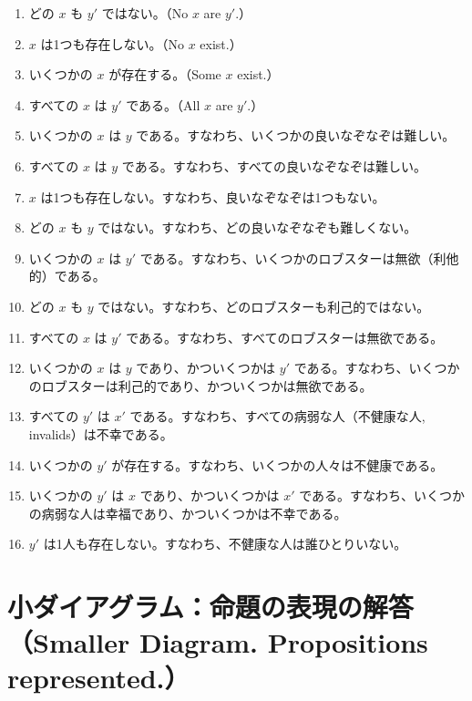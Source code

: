 \documentclass[a4paper,11pt,openany]{ltjsbook}
\begin{document}
\begin{enumerate}[label=\textbf{\arabic*.}]
\item どの $x$ も $y'$ ではない。（No $x$ are $y'$.）
\item $x$ は1つも存在しない。（No $x$ exist.）
\item いくつかの $x$ が存在する。（Some $x$ exist.）
\item すべての $x$ は $y'$ である。（All $x$ are $y'$.）
\item いくつかの $x$ は $y$ である。すなわち、いくつかの良いなぞなぞは難しい。
\item すべての $x$ は $y$ である。すなわち、すべての良いなぞなぞは難しい。
\item $x$ は1つも存在しない。すなわち、良いなぞなぞは1つもない。
\item どの $x$ も $y$ ではない。すなわち、どの良いなぞなぞも難しくない。
\item いくつかの $x$ は $y'$ である。すなわち、いくつかのロブスターは無欲（利他的）である。
\item どの $x$ も $y$ ではない。すなわち、どのロブスターも利己的ではない。
\item すべての $x$ は $y'$ である。すなわち、すべてのロブスターは無欲である。
\item いくつかの $x$ は $y$ であり、かついくつかは $y'$ である。すなわち、いくつかのロブスターは利己的であり、かついくつかは無欲である。
\item すべての $y'$ は $x'$ である。すなわち、すべての病弱な人（不健康な人, invalids）は不幸である。
\item いくつかの $y'$ が存在する。すなわち、いくつかの人々は不健康である。
\item いくつかの $y'$ は $x$ であり、かついくつかは $x'$ である。すなわち、いくつかの病弱な人は幸福であり、かついくつかは不幸である。
\item $y'$ は1人も存在しない。すなわち、不健康な人は誰ひとりいない。
\end{enumerate}

\section{小ダイアグラム：命題の表現の解答（Smaller Diagram. Propositions represented.）}
\end{document}
